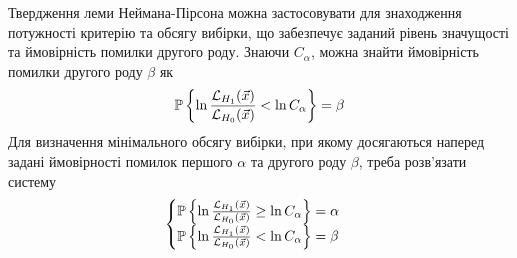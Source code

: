 Твердження леми Неймана-Пірсона можна застосовувати для знаходження потужності критерію та обсягу вибірки, що забезпечує заданий рівень значущості та ймовірність помилки другого роду.
Знаючи $C_{\alpha}$, можна знайти ймовірність помилки другого роду $\beta$ як
\begin{gather*}
    \P \left\{ \ln \frac{\mathcal{L}_{H_1}(\vec{x})}{\mathcal{L}_{H_0}(\vec{x})} < \ln C_{\alpha}\right\} = \beta
\end{gather*}
Для визначення мінімального обсягу вибірки, при якому досягаються наперед задані ймовірності помилок першого $\alpha$ та другого роду $\beta$,
треба розв'язати систему
\begin{gather*}
    \begin{cases}
        \P \left\{ \ln \frac{\mathcal{L}_{H_1}(\vec{x})}{\mathcal{L}_{H_0}(\vec{x})} \geq \ln C_{\alpha}\right\} = \alpha \\
        \P \left\{ \ln \frac{\mathcal{L}_{H_1}(\vec{x})}{\mathcal{L}_{H_0}(\vec{x})} < \ln C_{\alpha}\right\} = \beta
    \end{cases}
\end{gather*}

